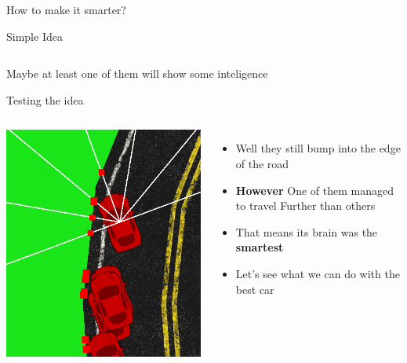 \documentclass{beamer}
\begin{document}
\begin{frame}{How to make it smarter?}
\begin{exampleblock}{Simple Idea}
\begin{tabular}{c|c|c|c|c|c|c|c}
        \end{tabular}
        Maybe at least one of them will show some inteligence
    \end{exampleblock}
    \begin{block}{Testing the idea}
        \begin{columns}
        \column{.24\textheight}
        \includegraphics[width=1.3\linewidth]{evolution.png}
        \column{.76\textheight}
        \footnotesize
            \begin{itemize}
                \item Well they still bump into the edge of the road
                \item \textbf{However} One of them managed to travel Further than others
                \item That means its brain was the \textbf{smartest}
                \item Let’s see what we can do with the best car
            \end{itemize}
   
    \end{columns}
    \end{block}

\end{frame}
\end{document}
